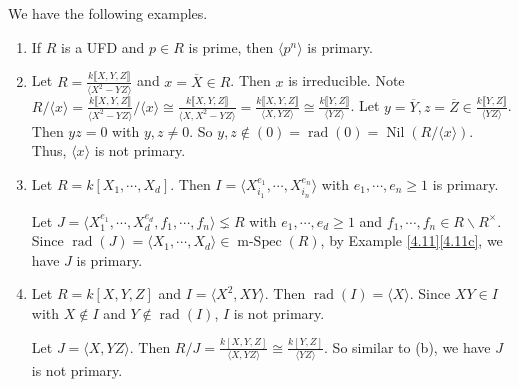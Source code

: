 \begin{example}\label{4.12}
    We have the following examples.
    \begin{enumerate}
        \item\label{4.12a} If $R$ is a UFD and $p \in R$ is prime, then $\langle p^{n} \rangle$ is primary.
        \item\label{4.12b} Let $R = \frac{k\llbracket X,Y ,Z \rrbracket}{\langle X^{2}-YZ \rangle}$ and $x = \overbar{X} \in R$. Then $x$ is irreducible. Note $R/\langle x \rangle = \frac{k\llbracket X,Y,Z \rrbracket}{\langle X^{2}-YZ \rangle}/\langle x \rangle \cong \frac{k\llbracket X,Y,Z \rrbracket}{\langle X,X^{2}-YZ \rangle} = \frac{k\llbracket X,Y,Z \rrbracket}{\langle X,YZ \rangle} \cong  \frac{k\llbracket Y,Z \rrbracket}{\langle YZ \rangle}$. Let $y = \overbar{Y}, z = \overbar{Z} \in \frac{k\llbracket Y,Z \rrbracket}{\langle YZ \rangle}$. Then $yz = 0$ with $y,z \neq 0$. So $y,z \not \in (0) = \operatorname{rad}(0) = \operatorname{Nil}(R/\langle x \rangle)$. Thus, $\langle x \rangle$ is not primary.
        \item\label{4.12c} Let $R = k[X_1,\cdots,X_d]$. Then $I = \langle X_{i_1}^{e_1}, \cdots ,X_{i_n}^{e_n} \rangle$ with $e_1,\cdots,e_n \geq 1$ is primary. \par
            Let $J = \langle X_{1}^{e_1},\cdots,X_d^{e_d},f_1,\cdots,f_n \rangle \lneq R$ with $e_1,\cdots,e_d \geq 1$ and $f_1,\cdots,f_n \in R \smallsetminus R^{\times}$. Since $\operatorname{rad}(J) = \langle X_{1},\cdots,X_d \rangle \in \operatorname{m-Spec}(R)$, by Example \ref{4.11}\ref{4.11c}, we have $J$ is primary.
        \item\label{4.12d} Let $R = k[X,Y,Z]$ and $I = \langle X^{2},XY\rangle$. Then $\operatorname{rad}(I) = \langle X \rangle$. Since $XY \in I$ with $X \not\in I$ and $Y \not\in \operatorname{rad}(I)$, $I$ is not primary. \par 
            Let $J = \langle X,YZ \rangle$. Then $R/J = \frac{k[X,Y,Z]}{\langle X,YZ \rangle} \cong \frac{k[Y,Z]}{\langle YZ \rangle}$. So similar to (b), we have $J$ is not primary.
    \end{enumerate}
\end{example}

